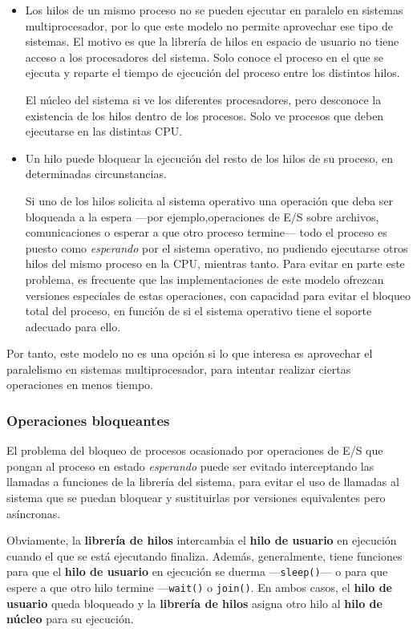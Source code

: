 \begin{itemize}
\item
  Los hilos de un mismo proceso no se pueden ejecutar en paralelo en
  sistemas multiprocesador, por lo que este modelo no permite aprovechar
  ese tipo de sistemas. El motivo es que la librería de hilos en espacio
  de usuario no tiene acceso a los procesadores del sistema. Solo conoce
  el proceso en el que se ejecuta y reparte el tiempo de ejecución del
  proceso entre los distintos hilos.

  El núcleo del sistema si ve los diferentes procesadores, pero
  desconoce la existencia de los hilos dentro de los procesos. Solo ve
  procesos que deben ejecutarse en las distintas CPU.
\item
  Un hilo puede bloquear la ejecución del resto de los hilos de su
  proceso, en determinadas circunstancias.

  Si uno de los hilos solicita al sistema operativo una operación que
  deba ser bloqueada a la espera ---por ejemplo,operaciones de E/S sobre
  archivos, comunicaciones o esperar a que otro proceso termine--- todo
  el proceso es puesto como \emph{esperando} por el sistema operativo,
  no pudiendo ejecutarse otros hilos del mismo proceso en la CPU,
  mientras tanto. Para evitar en parte este problema, es frecuente que
  las implementaciones de este modelo ofrezcan versiones especiales de
  estas operaciones, con capacidad para evitar el bloqueo total del
  proceso, en función de si el sistema operativo tiene el soporte
  adecuado para ello.
\end{itemize}

Por tanto, este modelo no es una opción si lo que interesa es aprovechar
el paralelismo en sistemas multiprocesador, para intentar realizar
ciertas operaciones en menos tiempo.

\subsubsection{Operaciones bloqueantes}\label{_operaciones_bloqueantes}

El problema del bloqueo de procesos ocasionado por operaciones de E/S
que pongan al proceso en estado \emph{esperando} puede ser evitado
interceptando las llamadas a funciones de la librería del sistema, para
evitar el uso de llamadas al sistema que se puedan bloquear y
sustituirlas por versiones equivalentes pero asíncronas.

Obviamente, la \textbf{librería de hilos} intercambia el \textbf{hilo de
usuario} en ejecución cuando el que se está ejecutando finaliza. Además,
generalmente, tiene funciones para que el \textbf{hilo de usuario} en
ejecución se duerma ---\texttt{sleep()}--- o para que espere a que otro
hilo termine ---\texttt{wait()} o \texttt{join()}. En ambos casos, el
\textbf{hilo de usuario} queda bloqueado y la \textbf{librería de hilos}
asigna otro hilo al \textbf{hilo de núcleo} para su ejecución.

